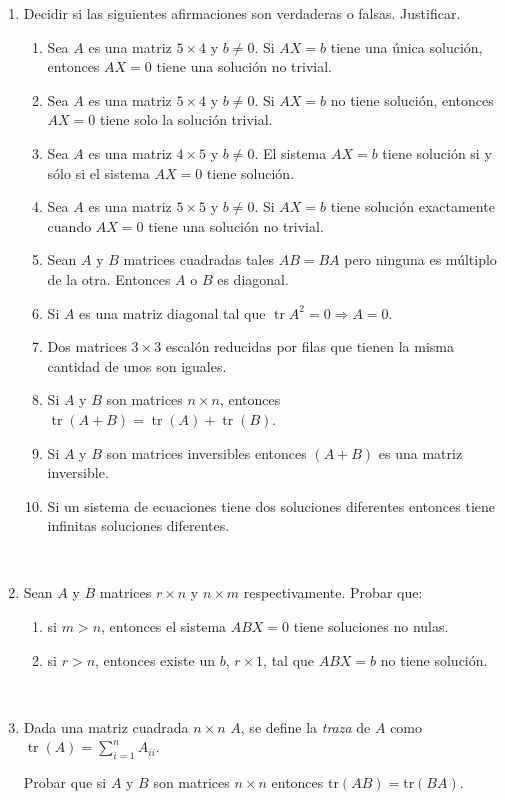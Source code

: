 \documentclass[11pt,spanish,makeidx]{amsbook}
\newcommand\tr{\operatorname{tr}}
\begin{document}
\begin{enumerate}
\item Decidir si las siguientes afirmaciones son verdaderas o falsas. Justificar.
\begin{enumerate}
\item Sea $A$ es una matriz $5\times 4$ y $b \ne 0$. Si $AX=b$ tiene una \'unica soluci\'on, entonces $AX=0$ tiene una soluci\'on no trivial.
\item Sea $A$ es una matriz $5\times 4$ y $b \ne 0$. Si $AX=b$ no tiene soluci\'on, entonces $AX=0$ tiene solo la soluci\'on trivial.
\item Sea $A$ es una matriz $4\times 5$ y $b \ne 0$. El sistema $AX=b$ tiene soluci\'on si y sólo si el sistema $AX=0$ tiene soluci\'on.
\item Sea $A$ es una matriz $5\times 5$ y $b \ne 0$. Si $AX=b$ tiene soluci\'on exactamente cuando $AX=0$ tiene una soluci\'on no trivial.
\item
Sean $A$ y $B$ matrices cuadradas tales $AB=BA$ pero ninguna es m\'ultiplo de la otra.
Entonces $A$ o $B$ es diagonal.
\item Si $A$ es una matriz diagonal tal que $\tr A^2=0 \Rightarrow A=0.$
\item Dos matrices $3\times 3$ escal\'on reducidas por filas que tienen la misma cantidad
de unos son iguales.
\item Si $A$ y $B$ son matrices $n\times n$, entonces $\tr(A+B)=\tr(A)+\tr(B)$.
\item Si $A$ y $B$ son matrices inversibles entonces $(A+B)$ es una matriz inversible.
\item Si un sistema de ecuaciones tiene dos soluciones diferentes entonces tiene infinitas soluciones diferentes.
\end{enumerate}

\

\item
Sean $A$ y $B$ matrices $r\times n$ y $n\times m$ respectivamente.
Probar que:
 \begin{enumerate}
    \item  si $m>n$, entonces el sistema $ABX=0$ tiene soluciones no nulas.
  \item  si $r>n$, entonces existe un $b$, $r\times 1$, tal que $ABX=b$
   no tiene soluci\'on.
 \end{enumerate}

\

\item Dada una matriz cuadrada $n\times n$ $A$, se define la {\it traza} de $A$
 como $\tr(A)=\displaystyle{\sum_{i=1}^n} A_{ii}$. 
 
 Probar que si $A$ y $B$ son matrices $n\times n$ entonces
$\text{tr}(AB)=\text{tr}(BA)$.






\end{enumerate}
\end{document}

